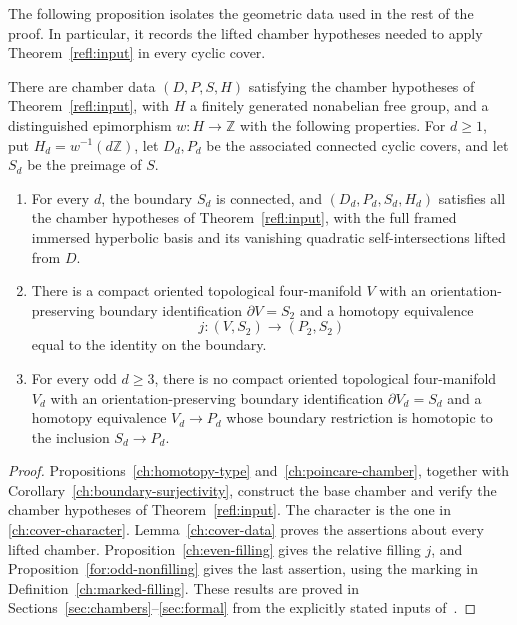 The following proposition isolates the geometric data used in the
rest of the proof.  In particular, it records the lifted chamber
hypotheses needed to apply Theorem~\ref{refl:input} in every cyclic
cover.

\begin{proposition}\label{refl:chamber-data}
There are chamber data $(D,P,S,H)$ satisfying the chamber hypotheses of
Theorem~\ref{refl:input}, with $H$ a finitely generated nonabelian free
group, and a distinguished epimorphism $w\colon H\to\mathbb Z$ with the following
properties.  For $d\geq1$, put $H_d=w^{-1}(d\mathbb Z)$, let
$D_d,P_d$ be the associated connected cyclic covers, and let $S_d$ be
the preimage of $S$.
\begin{enumerate}
\item For every $d$, the boundary $S_d$ is connected, and
$(D_d,P_d,S_d,H_d)$ satisfies all the chamber hypotheses of
Theorem~\ref{refl:input}, with the full framed immersed hyperbolic
basis and its vanishing quadratic self-intersections lifted from $D$.
\item There is a compact oriented topological four-manifold $V$ with
an orientation-preserving boundary identification $\partial V=S_2$
and a homotopy equivalence
\[
 j:(V,S_2)\longrightarrow(P_2,S_2)
\]
equal to the identity on the boundary.
\item For every odd $d\geq3$, there is no compact oriented topological
four-manifold $V_d$ with an orientation-preserving boundary
identification $\partial V_d=S_d$ and a homotopy equivalence
$V_d\to P_d$ whose boundary restriction is homotopic to the inclusion
$S_d\to P_d$.
\end{enumerate}
\end{proposition}

\begin{proof}
Propositions~\ref{ch:homotopy-type} and~\ref{ch:poincare-chamber},
together with Corollary~\ref{ch:boundary-surjectivity}, construct the
base chamber and verify the chamber hypotheses of Theorem~\ref{refl:input}.
The character is the one in \eqref{ch:cover-character}.
Lemma~\ref{ch:cover-data} proves the assertions about every lifted
chamber.  Proposition~\ref{ch:even-filling} gives the relative filling
$j$, and Proposition~\ref{for:odd-nonfilling} gives the last assertion,
using the marking in Definition~\ref{ch:marked-filling}.  These results
are proved in Sections~\ref{sec:chambers}--\ref{sec:formal} from the
explicitly stated inputs of~\cite{MT,PD}.
\end{proof}

